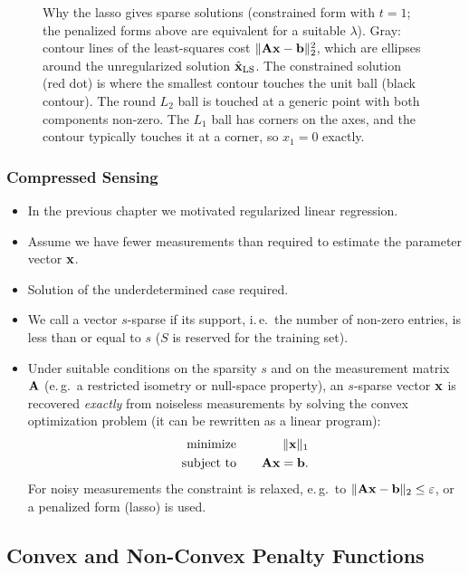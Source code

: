 \begin{figure}[htbp]
\begin{tikzpicture}
    \end{tikzpicture}
    \caption{Why the lasso gives sparse solutions (constrained form with $t=1$; the penalized forms above are equivalent for a suitable $\lambda$). Gray: contour lines of the least-squares cost $\|\mathbf{A}\bm{\mathrm{x}}-\bm{\mathrm{b}}\|_2^2$, which are ellipses around the unregularized solution $\hat{\bm{\mathrm{x}}}_{\text{LS}}$. The constrained solution (red dot) is where the smallest contour touches the unit ball (black contour). The round $L_2$ ball is touched at a generic point with both components non-zero. The $L_1$ ball has corners on the axes, and the contour typically touches it at a corner, so $x_1=0$ exactly.}
    \label{fig:ridge_lasso}
  \end{figure}

\subsubsection{Compressed Sensing}\autocite{candes2008,boyd2004}
\begin{itemize}
    \item In the previous chapter we motivated regularized linear regression. 
    \item Assume we have fewer measurements than required to estimate the parameter vector $\bm{\mathrm{x}}$. 
    \item Solution of the underdetermined case required. 
    \item We call a vector $s$-sparse if its support, i.\,e.\ the number of non-zero entries, is less than or equal to $s$ ($S$ is reserved for the training set).  
    \item Under suitable conditions on the sparsity $s$ and on the measurement matrix $\mathbf{A}$ (e.\,g.\ a restricted isometry or null-space property), an $s$-sparse vector $\bm{\mathrm{x}}$ is recovered \emph{exactly} from noiseless measurements by solving the convex optimization problem (it can be rewritten as a linear program):
      \begin{eqnarray*}
        \mbox{minimize}   & &\quad \|\bm{\mathrm{x}}\|_1\\
        \mbox{subject to} & & \quad \mathbf{A}\bm{\mathrm{x}} =\bm{\mathrm{b}}.
      \end{eqnarray*}
      For noisy measurements the constraint is relaxed, e.\,g.\ to $\|\mathbf{A}\bm{\mathrm{x}}-\bm{\mathrm{b}}\|_2\le\varepsilon$, or a penalized form (lasso) is used.
  \end{itemize}

\newpage
\subsection{Convex and Non-Convex Penalty Functions}

